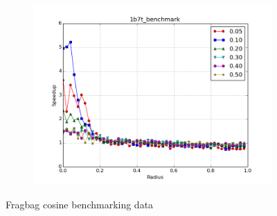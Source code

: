 \documentclass{amsbook}
\theoremstyle{definition}
\theoremstyle{remark}
\numberwithin{equation}{section}
\begin{document}
\begin{figure}[tbp]
\begin{subfigure}[b]{0.49\textwidth}
        \includegraphics[width=1\textwidth]{assets/1b7t_benchmark_cosine}
        \caption{}
    \end{subfigure}
    \caption{Fragbag cosine benchmarking data}
    \label{fig:fragbag_cosine}
\end{figure}
\end{document}
